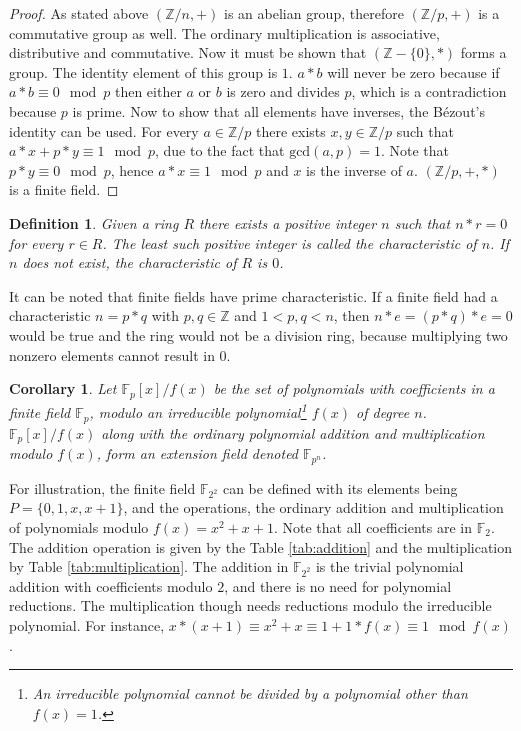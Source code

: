 \documentclass{ufsctex/ufsctex}
\newtheorem{definition}{Definition}
\newtheorem{corollary}{Corollary}
\begin{document}
\begin{proof}
As stated above $(\mathbb{Z}/n, +)$ is an abelian group, therefore
$(\mathbb{Z}/p, +)$ is a commutative group as well. The ordinary multiplication
is associative, distributive and commutative. Now it must be shown that
$(\mathbb{Z} - \{0\}, *)$ forms a group.  The identity element of this group is
$1$. $a*b$ will never be zero because if $a*b \equiv 0 \mod p$ then either $a$
or $b$ is zero and divides $p$, which is a contradiction because $p$ is prime.
Now to show that all elements have inverses, the Bézout's identity can be used.
For every $a \in \mathbb{Z}/p$ there exists $x, y \in \mathbb{Z}/p$ such that
$a*x + p*y \equiv 1 \mod p$, due to the fact that $\text{gcd}(a, p) = 1$. Note
that $p*y \equiv 0 \mod p$, hence $a*x \equiv 1 \mod p$ and $x$ is the inverse
of $a$. $(\mathbb{Z}/p, +, *)$ is a finite field.
\end{proof}

\begin{definition}
Given a ring $R$ there exists a positive integer $n$ such that $n*r = 0$ for
every $r \in R$. The least such positive integer is called the characteristic
of $n$. If $n$ does not exist, the characteristic of $R$ is $0$.
\end{definition}

It can be noted that finite fields have prime characteristic. If a finite field
had a characteristic $n = p*q$ with $p, q \in \mathbb{Z}$ and $1 < p,q < n$,
then $n*e = (p*q)*e = 0$ would be true and the ring would not be a division
ring, because multiplying two nonzero elements cannot result in $0$.

\begin{corollary}\label{cor:extension}
Let $\mathbb{F}_p[x]/f(x)$ be the set of polynomials with coefficients in a
finite field $\mathbb{F}_p$, modulo an irreducible polynomial\footnote{An
irreducible polynomial cannot be divided by a polynomial other than $f(x) =
1$.} $f(x)$ of degree $n$. $\mathbb{F}_p[x]/f(x)$ along with the ordinary
polynomial addition and multiplication modulo $f(x)$, form an extension field
denoted $\mathbb{F}_{p^n}$.
\end{corollary}

For illustration, the finite field $\mathbb{F}_{2^2}$ can be defined with its
elements being $P = \{0, 1, x, x+1\}$, and the operations, the ordinary
addition and multiplication of polynomials modulo $f(x) = x^2 + x + 1$. Note
that all coefficients are in $\mathbb{F}_2$. The addition operation is given by
the Table \ref{tab:addition} and the multiplication by Table
\ref{tab:multiplication}.  The addition in $\mathbb{F}_{2^2}$ is the trivial
polynomial addition with coefficients modulo $2$, and there is no need for
polynomial reductions. The multiplication though needs reductions modulo the
irreducible polynomial. For instance, $x*(x+1) \equiv x^2+x \equiv 1 + 1*f(x)
\equiv 1 \mod f(x)$.
\end{document}
